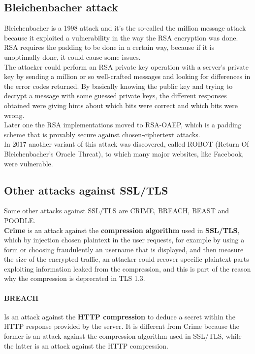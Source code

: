 \subsection{Bleichenbacher attack}
Bleichenbacher is a 1998 attack and it's the so-called the million
message attack because it exploited a vulnerability in the way the RSA
encryption was done. RSA requires the padding to be done in a certain
way, because if it is unoptimally done, it could cause some issues.\\
The attacker could perform an RSA private key operation with a
server’s private key by sending a million or so well-crafted messages
and looking for differences in the error codes returned. By basically
knowing the public key and trying to decrypt a message with some
guessed private keys, the different responses obtained were giving
hints about which bits were correct and which bits were wrong.\\
Later one the RSA implementations moved to RSA-OAEP, which is a
padding scheme that is provably secure against chosen-ciphertext
attacks.\\
In 2017 another variant of this attack was discovered, called
ROBOT (Return Of Bleichenbacher's Oracle Threat), to which many major
websites, like Facebook, were vulnerable.

\subsection{Other attacks against SSL/TLS}
Some other attacks against SSL/TLS are CRIME, BREACH, BEAST and
POODLE.\\
\textbf{Crime} is an attack against the \textbf{compression algorithm}
used in \textbf{SSL/TLS}, which by injection chosen plaintext in the
user requests, for example by using a form or choosing fraudulently an
username that is displayed, and then measure the size of the encrypted
traffic, an attacker could recover specific plaintext parts exploiting
information leaked from the compression, and this is part of the
reason why the compression is deprecated in TLS 1.3.
\paragraph{BREACH} 
Is an attack against the \textbf{HTTP compression} to deduce a secret
within the HTTP response provided by the server. It is different from
Crime because the former is an attack against the compression
algorithm used in SSL/TLS, while the latter is an attack against the
HTTP compression.
